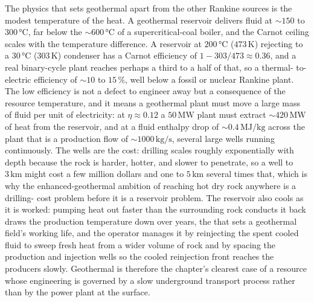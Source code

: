 The physics that sets geothermal apart from the other Rankine sources is the
modest temperature of the heat. A geothermal reservoir delivers fluid at
$\sim 150$ to $300\,\si{\celsius}$, far below the $\sim 600\,\si{\celsius}$
of a supercritical-coal boiler, and the Carnot ceiling scales with the
temperature difference. A reservoir at $200\,\si{\celsius}$ ($473\,\si{
\kelvin}$) rejecting to a $30\,\si{\celsius}$ ($303\,\si{\kelvin}$)
condenser has a Carnot efficiency of $1 - 303/473 \approx 0.36$, and a real
binary-cycle plant reaches perhaps a third to a half of that, so a thermal-
to-electric efficiency of $\sim 10$ to $15\,\%$, well below a fossil or
nuclear Rankine plant. The low efficiency is not a defect to engineer away
but a consequence of the resource temperature, and it means a geothermal
plant must move a large mass of fluid per unit of electricity: at
$\eta \approx 0.12$ a $50\,\si{\mega\watt}$ plant must extract $\sim
420\,\si{\mega\watt}$ of heat from the reservoir, and at a fluid enthalpy
drop of $\sim 0.4\,\si{\mega\joule\per\kilogram}$ across the plant that is a
production flow of $\sim 1000\,\si{\kilogram\per\second}$, several large wells
running continuously. The wells are the cost: drilling scales roughly
exponentially with depth because the rock is harder, hotter, and slower to
penetrate, so a well to $3\,\si{\kilo\meter}$ might cost a few million dollars
and one to $5\,\si{\kilo\meter}$ several times that, which is why the
enhanced-geothermal ambition of reaching hot dry rock anywhere is a drilling-
cost problem before it is a reservoir problem. The reservoir also cools as it
is worked: pumping heat out faster than the surrounding rock conducts it back
draws the production temperature down over years, the  that sets a geothermal field's working life, and the operator
manages it by reinjecting the spent cooled fluid to sweep fresh heat from a
wider volume of rock and by spacing the production and injection wells so the
cooled reinjection front reaches the producers slowly. Geothermal is
therefore the chapter's clearest case of a resource whose engineering is
governed by a slow underground transport process rather than by the power
plant at the surface.

